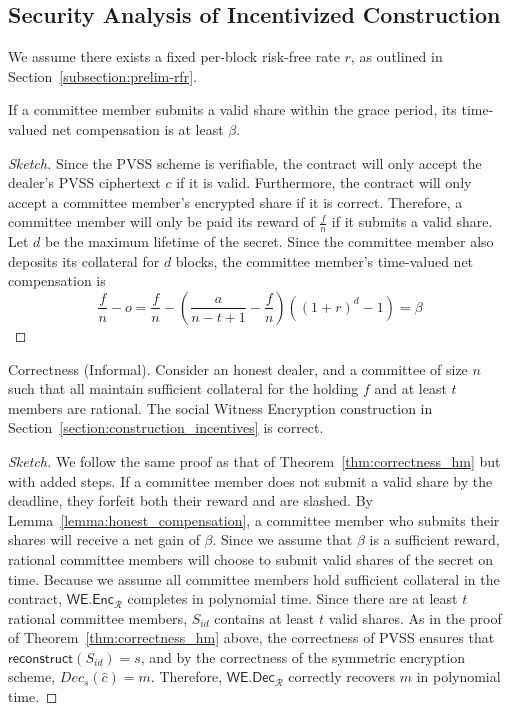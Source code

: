 \subsection{Security Analysis of Incentivized Construction}
We assume there exists a fixed per-block risk-free rate $r$, as outlined in Section~\ref{subsection:prelim-rfr}.
\begin{lemma}\label{lemma:honest_compensation}
    If a committee member submits a valid share within the grace period, its time-valued net compensation is at least $\beta$.
\end{lemma}
\begin{proof}[Sketch]
    Since the PVSS scheme is verifiable, the contract will only accept the dealer's PVSS ciphertext $c$ if it is valid.
    Furthermore, the contract will only accept a committee member's encrypted share if it is correct.
    Therefore, a committee member will only be paid its reward of $\frac{f}{n}$ if it submits a valid share.
    Let $d$ be the maximum lifetime of the secret.
    Since the committee member also deposits its collateral for $d$ blocks, the committee member's time-valued net compensation is
    \begin{equation*}
        \frac{f}{n} - o = \frac{f}{n} - (\frac{a}{n - t + 1} - \frac{f}{n})((1 + r)^d - 1) = \beta
    \end{equation*}
\end{proof}
\begin{theorem}{Correctness (Informal).}
    Consider an honest dealer, and a committee of size $n$ such that all maintain sufficient collateral for the holding $f$ and at least $t$ members are rational.
    The social Witness Encryption construction in Section~\ref{section:construction_incentives} is correct.
\end{theorem}
\begin{proof}[Sketch]
    We follow the same proof as that of Theorem~\ref{thm:correctness_hm} but with added steps.
    If a committee member does not submit a valid share by the deadline, they forfeit both their reward and are slashed.
    By Lemma~\ref{lemma:honest_compensation}, a committee member who submits their shares will receive a net gain of $\beta$.
    Since we assume that $\beta$ is a sufficient reward, rational committee members will choose to submit valid shares of the secret on time.
    Because we assume all committee members hold sufficient collateral in the contract, $\textsf{WE.Enc}_\mathcal{R}$ completes in polynomial time.
    Since there are at least $t$ rational committee members, $S_{id}$ contains at least $t$ valid shares.
    As in the proof of Theorem~\ref{thm:correctness_hm} above, the correctness of PVSS ensures that $\textsf{reconstruct}(S_{id}) = s$, and by the correctness of the symmetric encryption scheme, $Dec_s(\hat{c}) = m$.
    Therefore, $\textsf{WE.Dec}_\mathcal{R}$ correctly recovers $m$ in polynomial time.
\end{proof}
